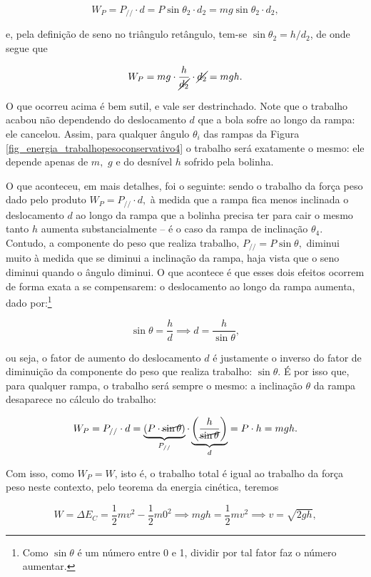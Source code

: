 $$ W_P = P_{//} \cdot d = P \sin \theta_2 \cdot d_2 = mg\sin \theta_2 \cdot d_2,$$

\noindent e, pela definição de seno no triângulo retângulo, tem-se $\sin \theta_2 = h/d_2$, de onde segue que

$$  W_P =  mg \cdot \dfrac{h}{\cancel {d_2}} \cdot \cancel {d_2} = mgh.$$

O que ocorreu acima é bem sutil, e vale ser destrinchado. Note que o trabalho acabou não dependendo do deslocamento $d$ que a bola sofre ao longo da rampa: ele cancelou. Assim, para qualquer ângulo $\theta_i$ das rampas da Figura \ref{fig_energia_trabalhopesoconservativo4} o trabalho será exatamente o mesmo: ele depende apenas de $m,$ $g$ e do desnível $h$ sofrido pela bolinha.

O que aconteceu, em mais detalhes, foi o seguinte: sendo o trabalho da força peso dado pelo produto $W_P = P_{//} \cdot d,$ à medida que a rampa fica menos inclinada o deslocamento $d$ ao longo da rampa que a bolinha precisa ter para cair o mesmo tanto $h$ aumenta substancialmente -- é o caso da rampa de inclinação $\theta_4.$ Contudo, a componente do peso que realiza trabalho, $P_{//} = P \sin \theta,$ diminui muito à medida que se diminui a inclinação da rampa, haja vista que o seno diminui quando o ângulo diminui. O que acontece é que esses dois efeitos ocorrem de forma exata a se compensarem: o deslocamento ao longo da rampa aumenta, dado por:\footnote{Como $\sin \theta$ é um número entre 0 e 1, dividir por tal fator faz o número aumentar.}

$$ \sin \theta = \dfrac{h}{d} \implies d = \dfrac{h}{\sin \theta},$$

\noindent ou seja, o fator de aumento do deslocamento $d$ é justamente o inverso do fator de diminuição da componente do peso que realiza trabalho: $\sin \theta.$ É por isso que, para qualquer rampa, o trabalho será sempre o mesmo: a inclinação $\theta$ da rampa desaparece no cálculo do trabalho:

$$ W_P = P_{//} \cdot d = \underbrace{(P \cdot \cancel{\sin \theta})}_{P_{//}} \cdot \underbrace{\left(\dfrac{h}{\cancel{\sin \theta}} \right)}_{d}  = P \cdot h = mgh.$$

Com isso, como $W_P=W$, isto é, o trabalho total é igual ao trabalho da força peso neste contexto, pelo teorema da energia cinética, teremos

$$ W = \Delta E_C = \dfrac{1}{2}mv^2 - \dfrac{1}{2}m0^2\implies mgh = \dfrac{1}{2}mv^2 \implies \boxed{v=\sqrt{2gh},}$$

